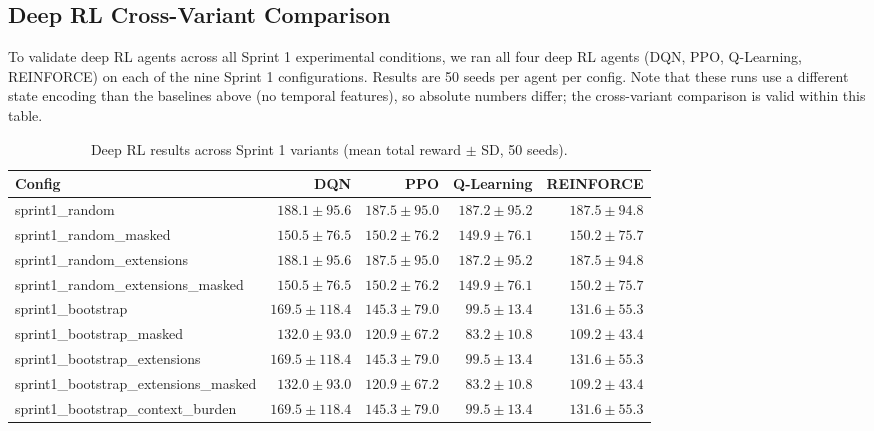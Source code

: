 \documentclass[11pt]{article}
\begin{document}
\subsection{Deep RL Cross-Variant Comparison}

To validate deep RL agents across all Sprint 1 experimental conditions, we ran all four deep RL agents (DQN, PPO, Q-Learning, REINFORCE) on each of the nine Sprint 1 configurations. Results are 50 seeds per agent per config. Note that these runs use a different state encoding than the baselines above (no temporal features), so absolute numbers differ; the cross-variant comparison is valid within this table.

\begin{table}[h]
\centering
\begin{tabular}{lrrrr}
\toprule
Config & DQN & PPO & Q-Learning & REINFORCE \\
\midrule
sprint1\_random & $188.1 \pm 95.6$ & $187.5 \pm 95.0$ & $187.2 \pm 95.2$ & $187.5 \pm 94.8$ \\
sprint1\_random\_masked & $150.5 \pm 76.5$ & $150.2 \pm 76.2$ & $149.9 \pm 76.1$ & $150.2 \pm 75.7$ \\
sprint1\_random\_extensions & $188.1 \pm 95.6$ & $187.5 \pm 95.0$ & $187.2 \pm 95.2$ & $187.5 \pm 94.8$ \\
sprint1\_random\_extensions\_masked & $150.5 \pm 76.5$ & $150.2 \pm 76.2$ & $149.9 \pm 76.1$ & $150.2 \pm 75.7$ \\
sprint1\_bootstrap & $169.5 \pm 118.4$ & $145.3 \pm 79.0$ & $99.5 \pm 13.4$ & $131.6 \pm 55.3$ \\
sprint1\_bootstrap\_masked & $132.0 \pm 93.0$ & $120.9 \pm 67.2$ & $83.2 \pm 10.8$ & $109.2 \pm 43.4$ \\
sprint1\_bootstrap\_extensions & $169.5 \pm 118.4$ & $145.3 \pm 79.0$ & $99.5 \pm 13.4$ & $131.6 \pm 55.3$ \\
sprint1\_bootstrap\_extensions\_masked & $132.0 \pm 93.0$ & $120.9 \pm 67.2$ & $83.2 \pm 10.8$ & $109.2 \pm 43.4$ \\
sprint1\_bootstrap\_context\_burden & $169.5 \pm 118.4$ & $145.3 \pm 79.0$ & $99.5 \pm 13.4$ & $131.6 \pm 55.3$ \\
\bottomrule
\end{tabular}
\caption{Deep RL results across Sprint 1 variants (mean total reward $\pm$ SD, 50 seeds).}
\label{tab:deep_rl_cross_variant}
\end{table}
\end{document}
